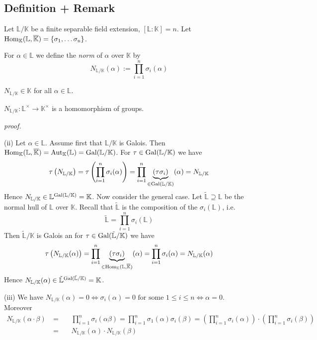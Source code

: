 \documentclass[12pt]{book}
\begin{document}
\begin{spacing}{1.3}
\subsection{Definition + Remark} %
Let $\mathbb{L}/\mathbb{K}$ be a finite separable field extension, $[\mathbb{L}:\mathbb{K}]=n$. Let $\rm{Hom}_{\mathbb{K}}(\mathbb{L},\overline{\mathbb{K}})=\{\sigma_1, \dots \sigma_n\}$.
\begin{compactenum}
\item For $\alpha \in\mathbb{L}$ we define the \textit{norm} of $\alpha$ over $\mathbb{K}$ by
$$N_{\mathbb{L}/\mathbb{K}}(\alpha):=\prod_{i=1}^n \sigma_i(\alpha)$$
\item $N_{\mathbb{L}/\mathbb{K}} \in \mathbb{K}$ for all $\alpha \in \mathbb{L}$.
\item $N_{\mathbb{L}/\mathbb{K}}: \mathbb{L}^{\times} \longrightarrow \mathbb{K}^{\times}$ is a homomorphism of groups.
\end{compactenum}
\textit{proof.}
\begin{compactenum}
\item[(ii)] Let $\alpha \in \mathbb{L}$.
Assume first that $\mathbb{L}/\mathbb{K}$ is Galois. Then $\rm{Hom}_{\mathbb{K}}(\mathbb{L},\overline{\mathbb{K}})=\rm{Aut}_{\mathbb{K}}(\mathbb{L})=\rm{Gal}(\mathbb{L}/\mathbb{K})$.
For $\tau \in \rm{Gal}(\mathbb{L}/\mathbb{K})$ we have
$$\tau\left(N_{\mathbb{L}/\mathbb{K}}\right)=\tau \left( \prod_{i=1}^n \sigma_i(\alpha) \right) = \prod_{i=1}^n \underbrace{(\tau \sigma_i)}_{\in \rm{Gal}(\mathbb{L}/\mathbb{K})}(\alpha)=N_{\mathbb{L}/\mathbb{K}}$$
Hence $N_{\mathbb{L}/\mathbb{K}} \in \mathbb{L}^{\rm{Gal}(\mathbb{L}/\mathbb{K})} = \mathbb{K}$.
Now consider the general case. Let $\tilde{\mathbb{L}} \supseteq \mathbb{L}$ be the normal hull of $\mathbb{L}$ over $\mathbb{K}$.  Recall that $\tilde{\mathbb{L}}$ is the composition of the $\sigma_i(\mathbb{L})$, i.e. $$\tilde{\mathbb{L}}=\prod_{i=1}^n \sigma_i(\mathbb{L})$$Then $\tilde{\mathbb{L}}/\mathbb{K}$ is Galois an for $\tau \in \rm{Gal}(\tilde{\mathbb{L}}/\mathbb{K})$ we have
$$\tau\left(N_{\mathbb{L}/\mathbb{K}}(\alpha)\right)=\prod_{i=1}^n \underbrace{(\tau \sigma_i)}_{\in \rm{Hom}_{\mathbb{K}}(\mathbb{L},\overline{\mathbb{K}})}(\alpha)=\prod_{i=1}^n \sigma_i(\alpha)=N_{\mathbb{L}/\mathbb{K}}(\alpha)$$
Hence $N_{\mathbb{L}/\mathbb{K}}(\alpha) \in \tilde{\mathbb{L}}^{\rm{Gal}(\tilde{\mathbb{L}}/\mathbb{K})}=\mathbb{K}$.
\item[(iii)] We have $N_{\mathbb{L}/\mathbb{K}}(\alpha)=0 \Longleftrightarrow \sigma_i(\alpha)=0 \textrm{ for some } 1\leqslant i \leqslant n \Leftrightarrow \alpha=0$.\\
Moreover
\begin{alignat*}{5}
N_{\mathbb{L}/\mathbb{K}}(\alpha \cdot \beta)\ &=&& \ \prod_{i=1}^n \sigma_i(\alpha \beta)=\prod_{i=1}^n \sigma_1(\alpha) \sigma_i(\beta)=\left(\prod_{i=1}^n \sigma_i(\alpha)\right) \cdot \left(\prod_{i=1}^n \sigma_i(\beta)\right)\\
&=&& \ N_{\mathbb{L}/\mathbb{K}}(\alpha) \cdot N_{\mathbb{L}/\mathbb{K}}(\beta)
\end{alignat*}


\end{compactenum}
\end{spacing}
\end{document}
